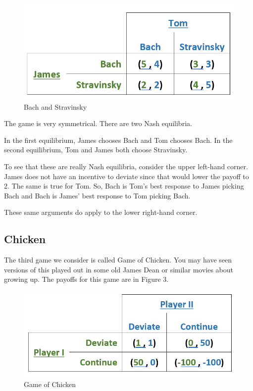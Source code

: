 \documentclass[
]{book}
\begin{document}
\begin{figure}

{\centering \includegraphics[width=0.5\linewidth]{img/gametheory/fig2} 

}

\caption{Bach and Stravinsky}\label{fig:gametheory02}
\end{figure}

The game is very symmetrical. There are two Nash equilibria.

In the first equilibrium, James chooses Bach and Tom chooses Bach. In the second equilibrium, Tom and James both choose Stravinsky.

To see that these are really Nash equilibria, consider the upper left-hand corner. James does not have an incentive to deviate since that would lower the payoff to 2. The same is true for Tom. So, Bach is Tom's best response to James picking Bach and Bach is James' best response to Tom picking Bach.

These same arguments do apply to the lower right-hand corner.

\hypertarget{chicken}{%
\subsection{Chicken}\label{chicken}}

The third game we consider is called Game of Chicken. You may have seen versions of this played out in some old James Dean or similar movies about growing up. The payoffs for this game are in Figure 3.

\begin{figure}

{\centering \includegraphics[width=0.5\linewidth]{img/gametheory/fig3} 

}

\caption{Game of Chicken}\label{fig:gametheory03}
\end{figure}
\end{document}
